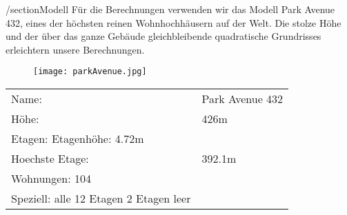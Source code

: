 /section{Modell}
Für die Berechnungen verwenden wir das Modell Park Avenue 432, eines der höchsten reinen Wohnhochhäusern auf der Welt. Die stolze Höhe und der über das ganze Gebäude gleichbleibende quadratische Grundrisses erleichtern unsere Berechnungen. 
\begin{figure}[H]
\centering
\texttt{[image: parkAvenue.jpg]}

\end{figure}
\begin{table}[H]
\begin{tabular}{ll}
Name:				& Park Avenue 432\\
Höhe: 				& 426m\\          
Etagen:				%
Etagenhöhe:			4.72m\\
Hoechste Etage:		&392.1m\\
Wohnungen:			104\\
Speziell:			alle 12 Etagen 2 Etagen leer\\           
\end{tabular}
\end{table}
